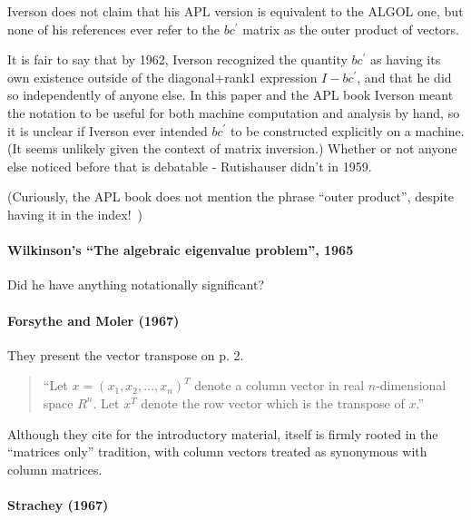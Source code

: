 Iverson does not claim that his APL version is equivalent to the ALGOL one, but none of his references ever refer to the $b c^\prime$ matrix as the outer product of vectors.

It is fair to say that by 1962, Iverson recognized the quantity $b c^\prime$ as having its own existence outside of the diagonal+rank1 expression $I - b c^\prime$, and that he did so independently of anyone else. In this paper and the APL book Iverson meant the notation to be useful for both machine computation and analysis by hand, so it is unclear if Iverson ever intended $b c^\prime$ to be constructed explicitly on a machine. (It seems unlikely given the context of matrix inversion.) Whether or not anyone else noticed before that is debatable - Rutishauser didn't in 1959.

(Curiously, the APL book does not mention the phrase ``outer product'', despite having it in the index!~\cite{Iverson1962book})


\paragraph{Wilkinson's ``The algebraic eigenvalue problem'', 1965}

Did he have anything notationally significant?



\paragraph{Forsythe and Moler (1967)~\cite{Forsythe1967}}

They present the vector transpose on p. 2.
\begin{quote}
``Let $x = {(x_1, x_2, \dots, x_n)}^T$ denote a column vector in real $n$-dimensional space $R^n$. Let $x^T$ denote the row vector which is the transpose of $x$.''~\cite[p. 2]{Forsythe1967}
\end{quote}

Although they cite \cite{Faddeev1959} for the introductory material, \cite{Faddeev1959} itself is firmly rooted in the ``matrices only'' tradition, with column vectors treated as synonymous with column matrices.



\paragraph{Strachey (1967)~\cite{Strachey1967}}

